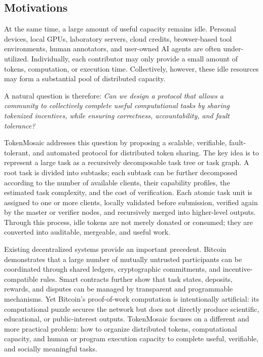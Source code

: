 \documentclass{article}
\theoremstyle{plain}
\begin{document}
\subsection{Motivations}

At the same time, a large amount of useful capacity remains idle. Personal devices, local GPUs, laboratory servers, cloud credits, browser-based tool environments, human annotators, and user-owned AI agents are often under-utilized. Individually, each contributor may only provide a small amount of tokens, computation, or execution time. Collectively, however, these idle resources may form a substantial pool of distributed capacity.

A natural question is therefore: \emph{Can we design a protocol that allows a community to collectively complete useful computational tasks by sharing tokenized incentives, while ensuring correctness, accountability, and fault tolerance?}


TokenMosaic addresses this question by proposing a scalable, verifiable, fault-tolerant, and automated protocol for distributed token sharing. The key idea is to represent a large task as a recursively decomposable task tree or task graph. A root task is divided into subtasks; each subtask can be further decomposed according to the number of available clients, their capability profiles, the estimated task complexity, and the cost of verification. Each atomic task unit is assigned to one or more clients, locally validated before submission, verified again by the master or verifier nodes, and recursively merged into higher-level outputs. Through this process, idle tokens are not merely donated or consumed; they are converted into auditable, mergeable, and useful work.

Existing decentralized systems provide an important precedent. Bitcoin demonstrates that a large number of mutually untrusted participants can be coordinated through shared ledgers, cryptographic commitments, and incentive-compatible rules. Smart contracts further show that task states, deposits, rewards, and disputes can be managed by transparent and programmable mechanisms. Yet Bitcoin's proof-of-work computation is intentionally artificial: its computational puzzle secures the network but does not directly produce scientific, educational, or public-interest outputs. TokenMosaic focuses on a different and more practical problem: how to organize distributed tokens, computational capacity, and human or program execution capacity to complete useful, verifiable, and socially meaningful tasks.
\end{document}
